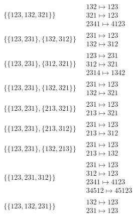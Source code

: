 \begin{scriptsize}
\begin{align}
\begin{matrix}
\end{matrix}
\\
\{\{123, 132, 321\}\}
\ 
&
\begin{matrix}
132 \mapsto 123\\321 \mapsto 123\\2341 \mapsto 4123
\end{matrix}
\\
\{\{123, 231\}, \{132, 312\}\}
\ 
&
\begin{matrix}
231 \mapsto 123\\132 \mapsto 312
\end{matrix}
\\
\{\{123, 231\}, \{312, 321\}\}
\ 
&
\begin{matrix}
123 \mapsto 231\\312 \mapsto 321\\2314 \mapsto 1342
\end{matrix}
\\
\{\{123, 231\}, \{132, 321\}\}
\ 
&
\begin{matrix}
231 \mapsto 123\\132 \mapsto 321
\end{matrix}
\\
\{\{123, 231\}, \{213, 321\}\}
\ 
&
\begin{matrix}
231 \mapsto 123\\213 \mapsto 321
\end{matrix}
\\
\{\{123, 231\}, \{213, 312\}\}
\ 
&
\begin{matrix}
231 \mapsto 123\\213 \mapsto 312
\end{matrix}
\\
\{\{123, 231\}, \{132, 213\}\}
\ 
&
\begin{matrix}
231 \mapsto 123\\213 \mapsto 132
\end{matrix}
\\
\{\{123, 231, 312\}\}
\ 
&
\begin{matrix}
231 \mapsto 123\\312 \mapsto 123\\2341 \mapsto 4123\\34512 \mapsto 45123
\end{matrix}
\\
\{\{123, 132, 231\}\}
\ 
&
\begin{matrix}
132 \mapsto 123\\231 \mapsto 123
\end{matrix}

\end{align}
\end{scriptsize}
